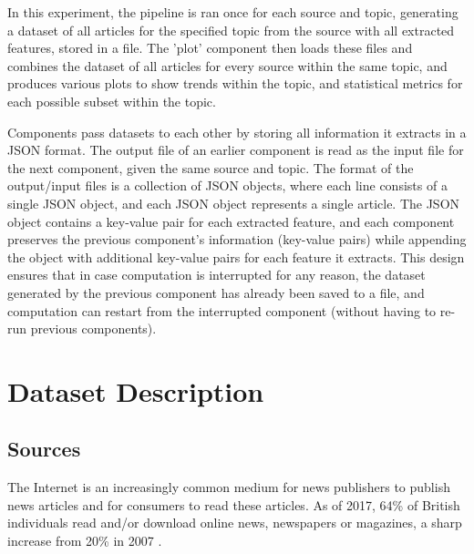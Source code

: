 \documentclass{report}
\begin{document}
In this experiment, the pipeline is ran once for each source and topic, generating a dataset of all articles for the specified topic from the source with all extracted features, stored in a file.
The 'plot' component then loads these files and combines the dataset of all articles for every source within the same topic, and produces various plots to show trends within the topic, and statistical metrics for each possible subset within the topic.

Components pass datasets to each other by storing all information it extracts in a JSON format.
The output file of an earlier component is read as the input file for the next component, given the same source and topic.
The format of the output/input files is a collection of JSON objects, where each line consists of a single JSON object, and each JSON object represents a single article.
The JSON object contains a key-value pair for each extracted feature, and each component preserves the previous component's information (key-value pairs) while appending the object with additional key-value pairs for each feature it extracts.
This design ensures that in case computation is interrupted for any reason, the dataset generated by the previous component has already been saved to a file, and computation can restart from the interrupted component (without having to re-run previous components).

\section{Dataset Description} \label{Dataset Description}  %

\subsection{Sources} \label{sources}

The Internet is an increasingly common medium for news publishers to publish news articles and for consumers to read these articles.
As of 2017, 64\% of British individuals read and/or download online news, newspapers or magazines, a sharp increase from 20\% in 2007 \cite{statista2018share}. 
\end{document}
